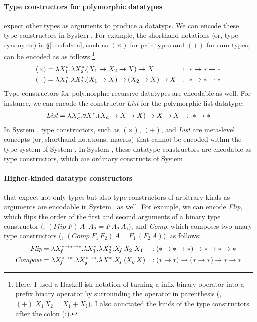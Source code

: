 \paragraph{Type constructors for polymorphic datatypes} expect
other types as arguments to produce a datatype. We can encode these 
type constructors in System \Fw. For example, the shorthand notations
(or, type synonyms) in \S\ref{sec:f:data}, such as $(\times)$ for pair types
and $(+)$ for sum types, can be encoded as as follows:\footnote{Here,
        I used a Haskell-ish notation of turning a infix binary operator
        into a prefix binary operator by surrounding the operator in parenthesis
        (\eg, $(+)\;X_1\,X_2 = X_1 + X_2$). I also annotated the kinds of
        the type constructors after the colon (:).}
\begin{align*}
(\times) &= \lambda X_1^{*}.\lambda X_2^{*}.(X_1 -> X_2 -> X) -> X &:~ * -> * -> * \\
     (+) &= \lambda X_1^{*}.\lambda X_2^{*}.(X_1 -> X) -> (X_2 -> X) -> X &:~ * -> * -> *
\end{align*}
Type constructors for polymorphic recursive datatypes are encodable as well.
For instance, we can encode the constructor \textit{List}
for the polymorphic list datatype:
\begin{align*}
        \textit{List} &= \lambda X_a^{*}.\forall X^{*}.(X_a -> X -> X) -> X -> X
        &:~ * -> *
\end{align*}
In System \F, type constructors, such as $(\times)$, $(+)$, and
\textit{List} are meta-level concepts (or, shorthand notations, macros)
that cannot be encoded within the type system of System \F.
In System \Fw, these datatype constructors are encodable as type constructors,
which are ordinary constructs of System \Fw.

\paragraph{Higher-kinded datatype constructors} that expect
not only types but also type constructors of arbitrary kinds as arguments
are encodable in System \Fw\ as well. For example, we can encode
\textit{Flip}, which flips the order of the first and second arguments of
a binary type constructor (\ie, $(\textit{Flip}\;F)\,A_1\,A_2 = F\,A_2\,A_1$),
and \textit{Comp}, which composes two unary type constructors
(\ie, $(\textit{Comp}\;F_1\,F_2)\,A = F_1\,(F_2\,A)$), as follows:
\begin{align*}
\textit{Flip} &= \lambda X_{\!f}^{*-> *-> *}.\lambda X_1^{*}.\lambda X_2^{*}.X_{\!f}\,X_2\;X_1
                     &:\;& (* -> * -> *) -> * -> * -> * \\
\textit{Compose} &= \lambda X_{\!f}^{*-> *}.\lambda X_g^{*-> *}.\lambda X^{*}.X_{\!f}\,(X_g\,X)
                     &:\;& (* -> *) -> (* -> *) -> * -> *
\end{align*}

